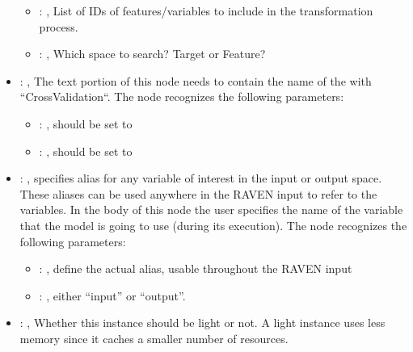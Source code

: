 \begin{itemize}
\begin{itemize}
        \item {}: , 
          List of IDs of features/variables to include in the transformation process.

        \item {}: , 
          Which space to search? Target or Feature?
      \end{itemize}

    \item {}: , 
      The text portion of this node needs to contain the name of the  with
               ``CrossValidation``.
      The  node recognizes the following parameters:
        \begin{itemize}
          \item {}: , 
            should be set to 
          \item {}: , 
            should be set to 
      \end{itemize}

    \item {}: , 
      specifies alias for         any variable of interest in the input or output space. These
      aliases can be used anywhere in the RAVEN input to         refer to the variables. In the body
      of this node the user specifies the name of the variable that the model is going to use
      (during its execution).
      The  node recognizes the following parameters:
        \begin{itemize}
          \item {}: , 
            define the actual alias, usable throughout the RAVEN input
          \item {}: , 
            either ``input'' or ``output''.
      \end{itemize}

    \item {}: , 
      Whether this instance should be light or not. A light instance uses
      less memory since it caches a smaller number of resources.


\end{itemize}
